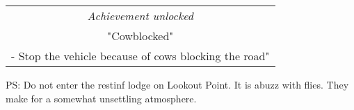 \begin{center}
\begin{tabular}{||c||}
\emph{Achievement unlocked}\\
"Cowblocked"\\
\multicolumn{1}{||p{0.8\textwidth}||}{\footnotesize - Stop the vehicle because of cows blocking the road"} \\
\end{tabular}
\end{center}

PS: Do not enter the restinf lodge on Lookout Point.
It is abuzz with flies.
They make for a somewhat unsettling atmosphere.

